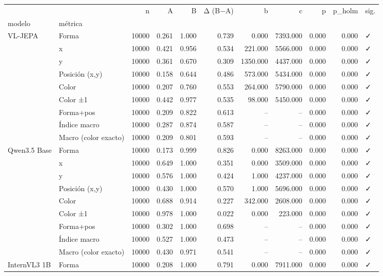 \begin{tabular}{llrrrrrrrrl}
\toprule
 &  & n & A & B & Δ (B−A) & b & c & p & p\_holm & sig. \\
modelo & métrica &  &  &  &  &  &  &  &  &  \\
\midrule
\multirow[t]{9}{*}{VL-JEPA} & Forma & 10000 & 0.261 & 1.000 & 0.739 & 0.000 & 7393.000 & 0.000 & 0.000 & ✓ \\
 & x & 10000 & 0.421 & 0.956 & 0.534 & 221.000 & 5566.000 & 0.000 & 0.000 & ✓ \\
 & y & 10000 & 0.361 & 0.670 & 0.309 & 1350.000 & 4437.000 & 0.000 & 0.000 & ✓ \\
 & Posición (x,y) & 10000 & 0.158 & 0.644 & 0.486 & 573.000 & 5434.000 & 0.000 & 0.000 & ✓ \\
 & Color & 10000 & 0.207 & 0.760 & 0.553 & 264.000 & 5790.000 & 0.000 & 0.000 & ✓ \\
 & Color ±1 & 10000 & 0.442 & 0.977 & 0.535 & 98.000 & 5450.000 & 0.000 & 0.000 & ✓ \\
 & Forma+pos & 10000 & 0.209 & 0.822 & 0.613 & -- & -- & 0.000 & 0.000 & ✓ \\
 & Índice macro & 10000 & 0.287 & 0.874 & 0.587 & -- & -- & 0.000 & 0.000 & ✓ \\
 & Macro (color exacto) & 10000 & 0.209 & 0.801 & 0.593 & -- & -- & 0.000 & 0.000 & ✓ \\
\cline{1-11}
\multirow[t]{9}{*}{Qwen3.5 Base} & Forma & 10000 & 0.173 & 0.999 & 0.826 & 0.000 & 8263.000 & 0.000 & 0.000 & ✓ \\
 & x & 10000 & 0.649 & 1.000 & 0.351 & 0.000 & 3509.000 & 0.000 & 0.000 & ✓ \\
 & y & 10000 & 0.576 & 1.000 & 0.424 & 1.000 & 4237.000 & 0.000 & 0.000 & ✓ \\
 & Posición (x,y) & 10000 & 0.430 & 1.000 & 0.570 & 1.000 & 5696.000 & 0.000 & 0.000 & ✓ \\
 & Color & 10000 & 0.688 & 0.914 & 0.227 & 342.000 & 2608.000 & 0.000 & 0.000 & ✓ \\
 & Color ±1 & 10000 & 0.978 & 1.000 & 0.022 & 0.000 & 223.000 & 0.000 & 0.000 & ✓ \\
 & Forma+pos & 10000 & 0.302 & 1.000 & 0.698 & -- & -- & 0.000 & 0.000 & ✓ \\
 & Índice macro & 10000 & 0.527 & 1.000 & 0.473 & -- & -- & 0.000 & 0.000 & ✓ \\
 & Macro (color exacto) & 10000 & 0.430 & 0.971 & 0.541 & -- & -- & 0.000 & 0.000 & ✓ \\
\cline{1-11}
\multirow[t]{9}{*}{InternVL3 1B} & Forma & 10000 & 0.208 & 1.000 & 0.791 & 0.000 & 7911.000 & 0.000 & 0.000 & ✓ \\

\end{tabular}
